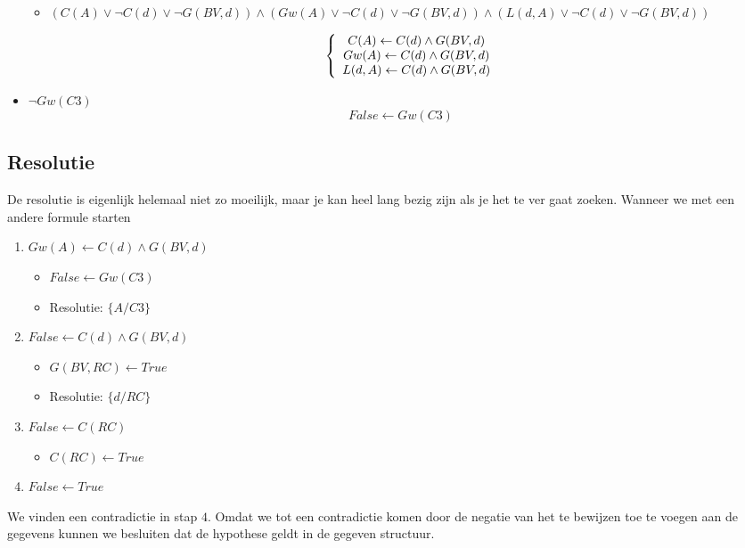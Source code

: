 \documentclass[alternative-exam.tex]{subfiles}
\begin{document}
\begin{itemize}
\begin{itemize}
\item 
$(C(A)\vee \neg C(d) \vee \neg G(BV,d)) \wedge (Gw(A)\vee  \neg C(d) \vee \neg G(BV,d)) \wedge (L(d,A) \vee \neg C(d) \vee \neg G(BV,d))$

\[
\left\{
\begin{array}{c c c}
C(A)\leftarrow  C(d) \wedge  G(BV,d)\\
Gw(A) \leftarrow  C(d) \wedge  G(BV,d)\\
L(d,A) \leftarrow C(d) \wedge G(BV,d)\\
\end{array}
\right.
\]
\end{itemize}

\item $\neg Gw(C3)$
\[
False \leftarrow Gw(C3)
\]
\end{itemize}

\subsection{Resolutie}
De resolutie is eigenlijk helemaal niet zo moeilijk, maar je kan heel lang bezig zijn als je het te ver gaat zoeken. Wanneer we met een andere formule starten 

\begin{enumerate}

\item $Gw(A) \leftarrow C(d) \wedge G(BV,d)$
\begin{itemize}
\item $False \leftarrow Gw(C3)$
\item Resolutie: $\{ A/C3\}$
\end{itemize}

\item $False \leftarrow C(d) \wedge G(BV,d)$
\begin{itemize}
\item $G(BV,RC) \leftarrow True$
\item Resolutie: $\{ d/RC\}$
\end{itemize}

\item $False \leftarrow C(RC)$
\begin{itemize}
\item $C(RC) \leftarrow True$
\end{itemize}

\item $False \leftarrow True$
\end{enumerate}
We vinden een contradictie in stap $4$. Omdat we tot een contradictie komen door de negatie van het te bewijzen toe te voegen aan de gegevens kunnen we besluiten dat de hypothese geldt in de gegeven structuur.
\end{document}
